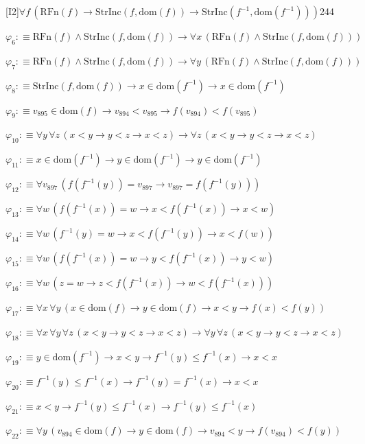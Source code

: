 \begin{fullproof}{[I2]}{$\forall f\,(\mathrm{RFn}(f) \to \mathrm{StrInc}(f,\mathrm{dom}(f)) \to \mathrm{StrInc}(f^{-1},\mathrm{dom}(f^{-1})))$}{244}
\begin{abbrevlist}
\item $\varphi_{6} :\equiv \mathrm{RFn}(f) \land \mathrm{StrInc}(f,\mathrm{dom}(f)) \to \forall x\,(\mathrm{RFn}(f) \land \mathrm{StrInc}(f,\mathrm{dom}(f)))$
\item $\varphi_{7} :\equiv \mathrm{RFn}(f) \land \mathrm{StrInc}(f,\mathrm{dom}(f)) \to \forall y\,(\mathrm{RFn}(f) \land \mathrm{StrInc}(f,\mathrm{dom}(f)))$
\item $\varphi_{8} :\equiv \mathrm{StrInc}(f,\mathrm{dom}(f)) \to x \in \mathrm{dom}(f^{-1}) \to x \in \mathrm{dom}(f^{-1})$
\item $\varphi_{9} :\equiv v_{895} \in \mathrm{dom}(f) \to v_{894} < v_{895} \to f(v_{894}) < f(v_{895})$
\item $\varphi_{10} :\equiv \forall y\,\forall z\,(x < y \to y < z \to x < z) \to \forall z\,(x < y \to y < z \to x < z)$
\item $\varphi_{11} :\equiv x \in \mathrm{dom}(f^{-1}) \to y \in \mathrm{dom}(f^{-1}) \to y \in \mathrm{dom}(f^{-1})$
\item $\varphi_{12} :\equiv \forall v_{897}\,(f(f^{-1}(y)) = v_{897} \to v_{897} = f(f^{-1}(y)))$
\item $\varphi_{13} :\equiv \forall w\,(f(f^{-1}(x)) = w \to x < f(f^{-1}(x)) \to x < w)$
\item $\varphi_{14} :\equiv \forall w\,(f^{-1}(y) = w \to x < f(f^{-1}(y)) \to x < f(w))$
\item $\varphi_{15} :\equiv \forall w\,(f(f^{-1}(x)) = w \to y < f(f^{-1}(x)) \to y < w)$
\item $\varphi_{16} :\equiv \forall w\,(z = w \to z < f(f^{-1}(x)) \to w < f(f^{-1}(x)))$
\item $\varphi_{17} :\equiv \forall x\,\forall y\,(x \in \mathrm{dom}(f) \to y \in \mathrm{dom}(f) \to x < y \to f(x) < f(y))$
\item $\varphi_{18} :\equiv \forall x\,\forall y\,\forall z\,(x < y \to y < z \to x < z) \to \forall y\,\forall z\,(x < y \to y < z \to x < z)$
\item $\varphi_{19} :\equiv y \in \mathrm{dom}(f^{-1}) \to x < y \to f^{-1}(y) \leq f^{-1}(x) \to x < x$
\item $\varphi_{20} :\equiv f^{-1}(y) \leq f^{-1}(x) \to f^{-1}(y) = f^{-1}(x) \to x < x$
\item $\varphi_{21} :\equiv x < y \to f^{-1}(y) \leq f^{-1}(x) \to f^{-1}(y) \leq f^{-1}(x)$
\item $\varphi_{22} :\equiv \forall y\,(v_{894} \in \mathrm{dom}(f) \to y \in \mathrm{dom}(f) \to v_{894} < y \to f(v_{894}) < f(y))$

\end{abbrevlist}
\end{fullproof}

